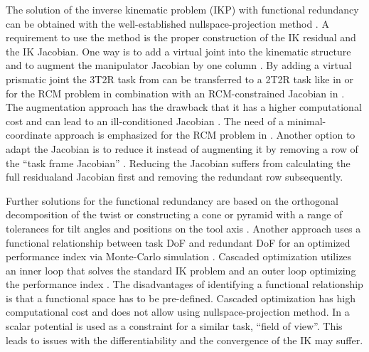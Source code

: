 \documentclass[graybox,vecphys]{svmult}
\begin{document}
The solution of the inverse kinematic problem (IKP) with functional redundancy can be obtained with the well-established nullspace-projection method \cite{SciaviccoSic2012}. 
A requirement to use the method is the proper construction of the IK residual and the IK Jacobian.
One way is to add a virtual joint into the kinematic structure and to augment the manipulator Jacobian by one column \cite{Baron2000}. 
By adding a virtual prismatic joint the 3T2R task from \cite{Baron2000} can be transferred to a 2T2R task like in \cite{ErdoesKarKem2015} or for the RCM problem in combination with an RCM-constrained Jacobian in \cite{SadeghianZokJaz2019}.
The augmentation approach has the drawback that it has a higher computational cost and can lead to an ill-conditioned Jacobian \cite{HuoBar2008}.
The need of a minimal-coordinate approach is emphasized for the RCM problem in \cite{SandovalPoiVie2017}.
Another option to adapt the Jacobian is to reduce it instead of augmenting it by removing a row of the ``task frame Jacobian'' \cite{Zlajpah2017}. 
Reducing the Jacobian suffers from calculating the full residualand Jacobian first and removing the redundant row subsequently. 

Further solutions for the functional redundancy are based on the orthogonal decomposition of the twist \cite{HuoBar2005} or constructing a cone or pyramid with a range of tolerances for tilt angles and positions on the tool axis \cite{FromGra2010}.
Another approach uses a functional relationship between task DoF and redundant DoF for an optimized performance index via Monte-Carlo simulation \cite{ZanchettinRocRobJoh2011}.
Cascaded optimization utilizes an inner loop that solves the standard IK problem and an outer loop optimizing the performance index \cite{ZhuQuCaoYan2013}. %
The disadvantages of identifying a functional relationship \cite{ZanchettinRocRobJoh2011} is that a functional space has to be pre-defined. 
Cascaded optimization has high computational cost and does not allow using nullspace-projection method.
In \cite{MoeAntTee2016} a scalar potential is used as a constraint for a similar task, ``field of view''. 
This leads to issues with the differentiability and the convergence of the IK may suffer.
\end{document}
